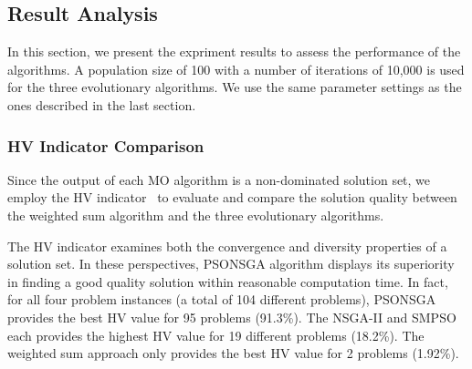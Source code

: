 \documentclass[10pt,journal,compsoc]{IEEEtran}
\newcommand{\Fig}[1]{Fig.~\ref{#1}}
\begin{document}
%

\subsection{Result Analysis}\label{resultanalyssi}
In this section, we present the expriment results to assess the performance of the algorithms.
A population size of 100 with a number of iterations of 10,000 is used for the three evolutionary algorithms. We use the same parameter settings as the ones described in the last section. %


\subsubsection{HV Indicator Comparison}
Since the output of each MO algorithm is a non-dominated solution set, we employ the HV indicator~\cite{Auger:2009:THI:1527125.1527138} to evaluate and compare the solution quality between the weighted sum algorithm and the three evolutionary algorithms. 

The HV indicator examines both the convergence and diversity properties of a solution set. In these perspectives, PSONSGA algorithm displays its superiority in finding a good quality solution within reasonable computation time. In fact, for all four problem instances (a total of 104 different problems), PSONSGA provides the best HV value for 95 problems (91.3\%). The NSGA-II and SMPSO each provides the highest HV value for 19 different problems (18.2\%). The weighted sum approach only provides the best HV value for 2 problems (1.92\%).
\end{document}
